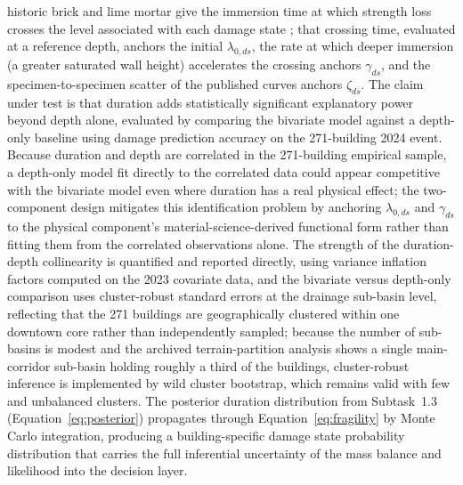 \documentclass[11pt]{article}
\begin{document}
historic brick and lime mortar give the immersion time at which strength loss
crosses the level associated with each damage state
\cite{hall2009water,franzoni2015compressive,sathiparan2018effect}; that crossing
time, evaluated at a reference depth, anchors the initial $\lambda_{0,ds}$, the
rate at which deeper immersion (a greater saturated wall height) accelerates the
crossing anchors $\gamma_{ds}$, and the specimen-to-specimen scatter of the
published curves anchors $\zeta_{ds}$.
The claim under test is that duration adds statistically significant explanatory
power beyond depth alone, evaluated by comparing the bivariate model against a
depth-only baseline using damage prediction accuracy on the 271-building 2024 event.
Because duration and depth are correlated in the 271-building empirical sample, a
depth-only model fit directly to the correlated data could appear competitive with
the bivariate model even where duration has a real physical effect; the
two-component design mitigates this identification problem by anchoring
$\lambda_{0,ds}$ and $\gamma_{ds}$ to the physical component's material-science-derived
functional form rather than fitting them from the correlated observations alone.
The strength of the duration-depth collinearity is quantified and reported directly, using variance inflation factors computed on the 2023 covariate data, and the bivariate versus depth-only comparison uses cluster-robust standard errors at the drainage sub-basin level, reflecting that the 271 buildings are geographically clustered within one downtown core rather than independently sampled; because the number of sub-basins is modest and the archived terrain-partition analysis shows a single main-corridor sub-basin holding roughly a third of the buildings, cluster-robust inference is implemented by wild cluster bootstrap, which remains valid with few and unbalanced clusters.
The posterior duration distribution from Subtask~1.3 (Equation~\eqref{eq:posterior}) propagates through
Equation~\eqref{eq:fragility} by Monte Carlo integration, producing a building-specific damage state
probability distribution that carries the full inferential uncertainty of the mass
balance and likelihood into the decision layer.
\end{document}
